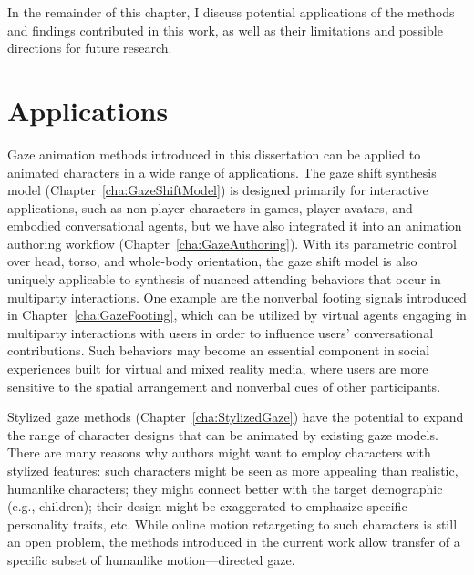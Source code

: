 In the remainder of this chapter, I discuss potential applications of the methods and findings contributed in this work, as well as their limitations and possible directions for future research.

\section{Applications}

Gaze animation methods introduced in this dissertation can be applied to animated characters in a wide range of applications. The gaze shift synthesis model (Chapter~\ref{cha:GazeShiftModel}) is designed primarily for interactive applications, such as non-player characters in games, player avatars, and embodied conversational agents, but we have also integrated it into an animation authoring workflow (Chapter~\ref{cha:GazeAuthoring}).
With its parametric control over head, torso, and whole-body orientation, the gaze shift model is also uniquely applicable to synthesis of nuanced attending behaviors that occur in multiparty interactions. One example are the nonverbal footing signals introduced in Chapter~\ref{cha:GazeFooting}, which can be utilized by virtual agents engaging in multiparty interactions with users in order to influence users' conversational contributions. Such behaviors may become an essential component in social experiences built for virtual and mixed reality media, where users are more sensitive to the spatial arrangement and nonverbal cues of other participants.

Stylized gaze methods (Chapter~\ref{cha:StylizedGaze}) have the potential to expand the range of character designs that can be animated by existing gaze models. There are many reasons why authors might want to employ characters with stylized features: such characters might be seen as more appealing than realistic, humanlike characters; they might connect better with the target demographic (e.g., children); their design might be exaggerated to emphasize specific personality traits, etc. While online motion retargeting to such characters is still an open problem, the methods introduced in the current work allow transfer of a specific subset of humanlike motion---directed gaze.

